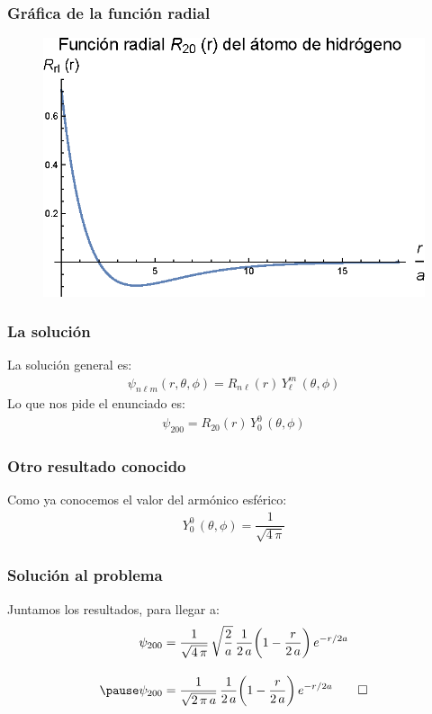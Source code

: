 \documentclass[12pt]{beamer}
\begin{document}
\begin{frame}
\frametitle{Gráfica de la función radial}
\begin{figure}
   \centering
   \includegraphics[scale=1]{Imagenes/Plot_Hermite_Radial_20.eps}
\end{figure}
\end{frame}
\begin{frame}
\frametitle{La solución}
La solución general es:
\begin{align*}
\psi_{n \ell m} (r, \theta, \phi) = R_{n \ell} (r) \, Y_{\ell}^{m} \, (\theta, \phi)
\end{align*}
\pause
Lo que nos pide el enunciado es:
\begin{align*}
\psi_{200} = R_{2 0} (r) \, Y_{0}^{0} \, (\theta, \phi)
\end{align*}
\end{frame}
\begin{frame}
\frametitle{Otro resultado conocido}
Como ya conocemos el valor del armónico esférico:
\begin{align*}
Y_{0}^{0} \, (\theta, \phi) = \dfrac{1}{\sqrt{4 \, \pi}}
\end{align*}
\end{frame}
\begin{frame}
\frametitle{Solución al problema}
Juntamos los resultados, para llegar a:
\pause
\begin{eqnarray*}
\begin{aligned}
\psi_{200} &= \dfrac{1}{\sqrt{4 \, \pi}} \, \sqrt{\dfrac{2}{a}} \, \dfrac{1}{2 \, a} \bigg( 1 - \dfrac{r}{2 \, a} \bigg) \, e^{-r/2a} \\[1em] \pause
\psi_{200} &= \dfrac{1}{\sqrt{2 \, \pi \, a}} \, \dfrac{1}{2 \, a} \bigg( 1 - \dfrac{r}{2 \, a} \bigg) \, e^{-r/2a} \qed
\end{aligned}
\end{eqnarray*}
\end{frame}
\end{document}
